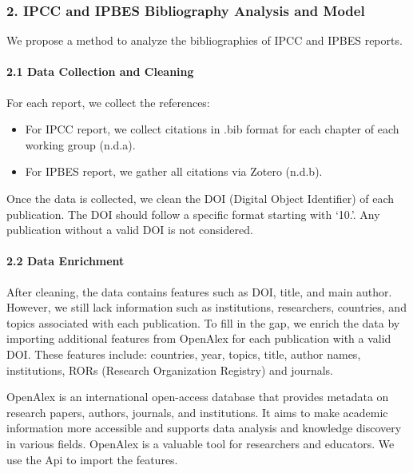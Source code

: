 \documentclass[
]{article}
\providecommand{\tightlist}{%
  \setlength{\itemsep}{0pt}\setlength{\parskip}{0pt}}
\begin{document}
\hypertarget{ipcc-and-ipbes-bibliography-analysis-and-model}{%
\subsubsection{2. IPCC and IPBES Bibliography Analysis and
Model}\label{ipcc-and-ipbes-bibliography-analysis-and-model}}

We propose a method to analyze the bibliographies of IPCC and IPBES
reports.

\hypertarget{data-collection-and-cleaning}{%
\paragraph{2.1 Data Collection and
Cleaning}\label{data-collection-and-cleaning}}

For each report, we collect the references:

\begin{itemize}
\tightlist
\item
  For IPCC report, we collect citations in .bib format for each chapter
  of each working group (n.d.a).
\item
  For IPBES report, we gather all citations via Zotero (n.d.b).
\end{itemize}

Once the data is collected, we clean the DOI (Digital Object Identifier)
of each publication. The DOI should follow a specific format starting
with `10.'. Any publication without a valid DOI is not considered.

\hypertarget{data-enrichment}{%
\paragraph{2.2 Data Enrichment}\label{data-enrichment}}

After cleaning, the data contains features such as DOI, title, and main
author. However, we still lack information such as institutions,
researchers, countries, and topics associated with each publication. To
fill in the gap, we enrich the data by importing additional features
from OpenAlex for each publication with a valid DOI. These features
include: countries, year, topics, title, author names, institutions,
RORs (Research Organization Registry) and journals.

OpenAlex is an international open-access database that provides metadata
on research papers, authors, journals, and institutions. It aims to make
academic information more accessible and supports data analysis and
knowledge discovery in various fields. OpenAlex is a valuable tool for
researchers and educators. We use the Api to import the features.
\end{document}
